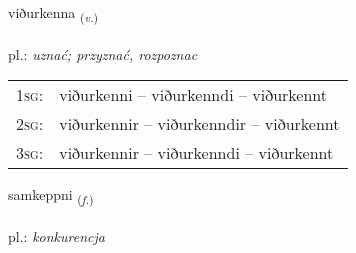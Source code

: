 \documentclass[frontgrid, backgrid]{flacards}\usepackage[]{graphicx}\usepackage[]{xcolor}
\begin{document}
\renewcommand{\flhead}{\vskip5pt \fboxsep=0pt {\small\bfseries\footnotesize Sagnorð | czasownik}}
\renewcommand{\fcfoot}{\vskip5pt \fboxsep=0pt \hspace{2pt}{\small\bfseries\footnotesize 1K}}

\renewcommand{\blhead}{\vskip5pt {\small\bfseries\footnotesize Sagnorð | czasownik }}
\renewcommand{\bcfoot}{\vskip5pt \hspace{2pt}{\small\bfseries\footnotesize 1K}}


{viðurkenna \small{\textsubscript{(\textit{v.})}} \\[1ex] %
 \\
pl.: \emph{uznać; przyznać, rozpoznac} \\  [2ex]
\renewcommand*{\arraystretch}{0.8}
\begin{tabular}{p{1cm}l}
\textsc{1sg}: & viðurkenni -- viðurkenndi -- viðurkennt \\ 
\textsc{2sg}: & viðurkennir -- viðurkenndir -- viðurkennt \\ 
\textsc{3sg}: & viðurkennir -- viðurkenndi -- viðurkennt \\ 
\end{tabular}
}

\renewcommand{\flhead}{\vskip5pt \fboxsep=0pt {\small\bfseries\footnotesize Nafnorð | rzeczownik}}
\renewcommand{\fcfoot}{\vskip5pt \fboxsep=0pt \hspace{2pt}{\small\bfseries\footnotesize 1K}}

\renewcommand{\blhead}{\vskip5pt {\small\bfseries\footnotesize Nafnorð | rzeczownik }}
\renewcommand{\bcfoot}{\vskip5pt \hspace{2pt}{\small\bfseries\footnotesize 1K}}


{samkeppni \small{\textsubscript{(\textit{f.})}} \\[1ex] %
\textphonetic{[samcʰɛhpnɪ]} \\
pl.: \emph{konkurencja} \\  [2ex]
\renewcommand*{\arraystretch}{0.8}
}
\end{document}

